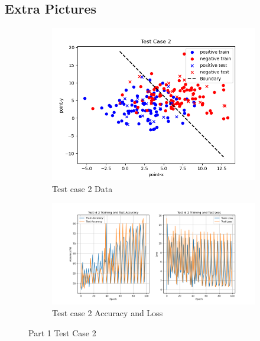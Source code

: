 \documentclass{article}
\begin{document}
\begin{appendix}

\section{Extra Pictures}

\begin{figure}[!ht]
  \centering
  \begin{subfigure}[b]{0.5\textwidth}
    \includegraphics[width=\textwidth]{img/Part1/test2_data.png}
    \caption{Test case 2 Data}
  \end{subfigure}
  \begin{subfigure}[b]{1\textwidth}
    \includegraphics[width=\textwidth]{img/Part1/test2_curve.png}
    \caption{Test case 2 Accuracy and Loss}
  \end{subfigure}
  \caption{Part 1 Test Case 2}
  \label{fig:p1test2}
\end{figure}


\end{appendix}
\end{document}

